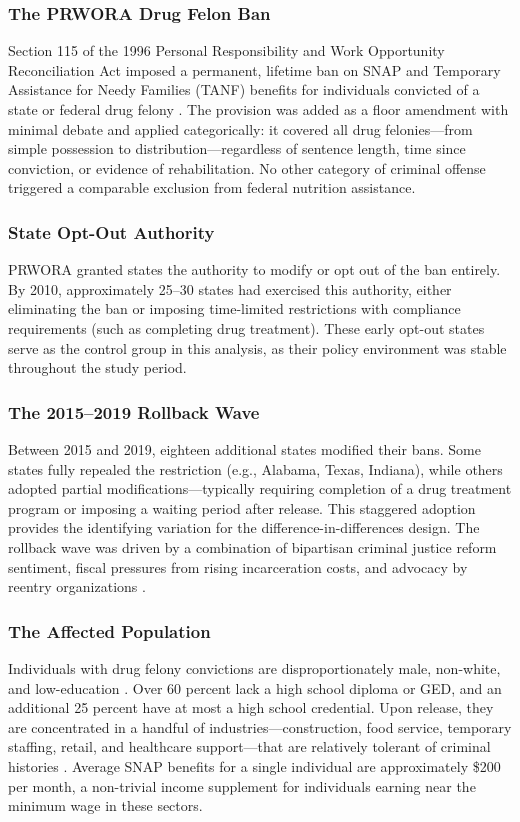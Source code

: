 \documentclass[12pt]{article}
\begin{document}
\subsubsection*{The PRWORA Drug Felon Ban} Section 115 of the 1996 Personal Responsibility and Work Opportunity Reconciliation Act imposed a permanent, lifetime ban on SNAP and Temporary Assistance for Needy Families (TANF) benefits for individuals convicted of a state or federal drug felony \citep{mccarty2016drug}. The provision was added as a floor amendment with minimal debate and applied categorically: it covered all drug felonies---from simple possession to distribution---regardless of sentence length, time since conviction, or evidence of rehabilitation. No other category of criminal offense triggered a comparable exclusion from federal nutrition assistance.

\subsubsection*{State Opt-Out Authority} PRWORA granted states the authority to modify or opt out of the ban entirely. By 2010, approximately 25--30 states had exercised this authority, either eliminating the ban or imposing time-limited restrictions with compliance requirements (such as completing drug treatment). These early opt-out states serve as the control group in this analysis, as their policy environment was stable throughout the study period.

\subsubsection*{The 2015--2019 Rollback Wave} Between 2015 and 2019, eighteen additional states modified their bans. Some states fully repealed the restriction (e.g., Alabama, Texas, Indiana), while others adopted partial modifications---typically requiring completion of a drug treatment program or imposing a waiting period after release. This staggered adoption provides the identifying variation for the difference-in-differences design. The rollback wave was driven by a combination of bipartisan criminal justice reform sentiment, fiscal pressures from rising incarceration costs, and advocacy by reentry organizations \citep{petersilia2003when}.

\subsubsection*{The Affected Population} Individuals with drug felony convictions are disproportionately male, non-white, and low-education \citep{harlow2003education}. Over 60 percent lack a high school diploma or GED, and an additional 25 percent have at most a high school credential. Upon release, they are concentrated in a handful of industries---construction, food service, temporary staffing, retail, and healthcare support---that are relatively tolerant of criminal histories \citep{apel2010criminal}. Average SNAP benefits for a single individual are approximately \$200 per month, a non-trivial income supplement for individuals earning near the minimum wage in these sectors.
\end{document}
